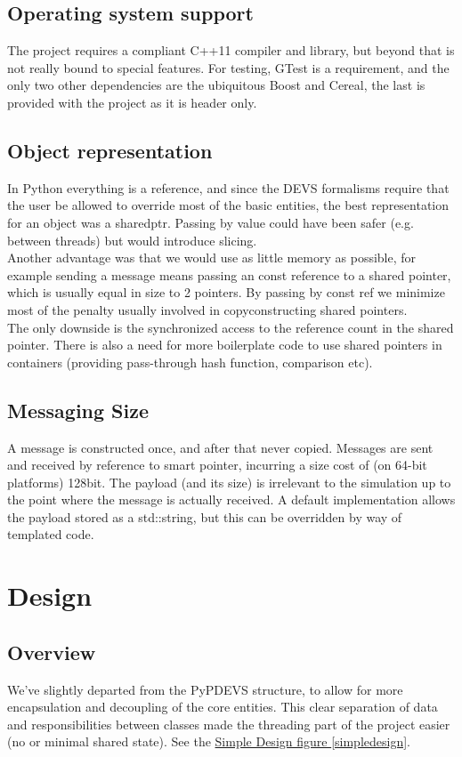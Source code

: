 \documentclass[8pt,a4paper]{report}
\begin{document}
\section{Operating system support}
The project requires a compliant C++11 compiler and library, but beyond that is not really bound to special features. For testing, GTest is a requirement, and the only two other dependencies are the ubiquitous Boost and Cereal, the last is provided with the project as it is header only.

\section{Object representation}
In Python everything is a reference, and since the DEVS formalisms require that the user be allowed to override most of the basic entities, the best representation for an object was a shared\textunderscore ptr. Passing by value could have been safer (e.g. between threads) but would introduce slicing.\\ Another advantage was that we would use as little memory as possible, for example sending a message means passing an const reference to a shared pointer, which is usually equal in size to 2 pointers. By passing by const ref we minimize most of the penalty usually involved in copyconstructing shared pointers. \\
The only downside is the synchronized access to the reference count in the shared pointer. There is also a need for more boilerplate code to use shared pointers in containers (providing pass-through hash function, comparison etc). 

\section{Messaging Size}
A message is constructed once, and after that never copied. Messages are sent and received by reference to smart pointer, incurring a size cost of (on 64-bit platforms) 128bit. The payload (and its size) is irrelevant to the simulation up to the point where the message is actually received. A default implementation allows the payload stored as a std::string, but this can be overridden by way of templated code. %

\chapter{Design}
\section{Overview}
We've slightly departed from the PyPDEVS structure, to allow for more encapsulation and decoupling of the core entities. This clear separation of data and responsibilities between classes made the threading part of the project easier (no or minimal shared state). See the \hyperref[simpledesign]{Simple Design figure \ref*{simpledesign}}.\\
\end{document}
